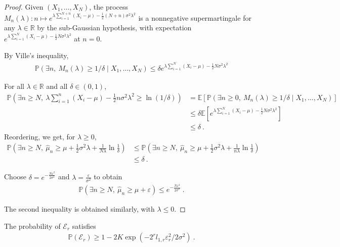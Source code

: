 \begin{proof}
Given $(X_1, \ldots, X_N)$, the process $M_n(\lambda) : n \mapsto e^{\lambda\sum_{i=1}^{N+n} (X_i - \mu) - \frac{1}{2}(N+n) \sigma^2 \lambda^2}$ is a nonnegative supermartingale for any $\lambda \in \mathbb{R}$ by the sub-Gaussian hypothesis, with expectation $e^{\lambda\sum_{i=1}^{N} (X_i - \mu) - \frac{1}{2}N \sigma^2 \lambda^2}$ at $n=0$.

By Ville's inequality,
\begin{align*}
\mathbb{P}(\exists n, \  M_n(\lambda) \ge 1/\delta \mid X_1, \ldots, X_N)
\le \delta e^{\lambda\sum_{i=1}^{N} (X_i - \mu) - \frac{1}{2}N \sigma^2 \lambda^2}
\end{align*}

For all $\lambda \in \mathbb{R}$ and all $\delta \in (0,1)$,
\begin{align*}
\mathbb{P}\left(\exists n \ge N, \  \lambda\sum_{i=1}^{n} (X_i - \mu) - \frac{1}{2}n\sigma^2 \lambda^2 \ge \ln(1/\delta)\right)
&= \mathbb{E}\left[\mathbb{P}(\exists n \ge 0, \  M_n(\lambda) \ge 1/\delta \mid X_1, \ldots, X_N)\right]
\\
&\le \delta \mathbb{E}\left[e^{\lambda\sum_{i=1}^{N} (X_i - \mu) - \frac{1}{2}N \sigma^2 \lambda^2}\right]
\\
&\le \delta
\: .
\end{align*}
Reordering, we get, for $\lambda \ge 0$,
\begin{align*}
\mathbb{P}\left(\exists n \ge N, \  \hat{\mu}_n \ge \mu + \frac{1}{2}\sigma^2 \lambda + \frac{1}{N \lambda}\ln\frac{1}{\delta}\right)
&\le \mathbb{P}\left(\exists n \ge N, \  \hat{\mu}_n \ge \mu + \frac{1}{2}\sigma^2 \lambda + \frac{1}{n \lambda}\ln\frac{1}{\delta}\right)
\\
&\le \delta
\: .
\end{align*}

Choose $\delta = e^{-\frac{N \varepsilon^2}{2 \sigma^2}}$ and $\lambda = \frac{\varepsilon}{\sigma^2}$ to obtain
\begin{align*}
\mathbb{P}\left(\exists n \ge N, \  \hat{\mu}_n \ge \mu + \varepsilon \right)
\le e^{-\frac{N \varepsilon^2}{2 \sigma^2}}
\: .
\end{align*}

The second inequality is obtained similarly, with $\lambda \le 0$.
\end{proof}

\begin{lemma}\label{lem:probaE_bis}
	The probability of $\mathcal E_r$ satisfies
	\begin{align*}
	\mathbb{P}(\mathcal E_r) \ge 1-2K\exp(- 2^r l_{1,r} \varepsilon_r^2/2\sigma^2)
	\: .
	\end{align*}
\end{lemma}

